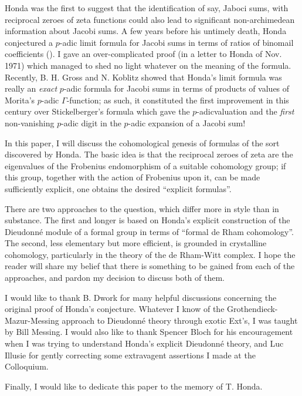 Honda was the first to suggest that the identification of say, Jaboci sums, with reciprocal zeroes of zeta functions could also lead to significant non-archimedean information about Jacobi sums. A few years before his untimely death, Honda conjectured a $p$-adic limit formula for Jacobi sums in terms of ratios of binomail coefficients (\cite{art6-key23}). I gave an over-complicated proof (in a letter to Honda of Nov. 1971) which managed to shed no light whatever on the meaning of the formula. Recently, B. H. Gross and N. Koblitz \cite{art6-key14} showed that Honda's limit formula was really an {\em exact} $p$-adic formula for Jacobi sums in terms of products of values of Morita's $p$-adic $\Gamma$-function; as such, it constituted the first improvement in this century over Stickelberger's formula which gave the $p$-adic\pageoriginale valuation and the {\em first} non-vanishing $p$-adic digit in the $p$-adic expansion of a Jacobi sum!

In this paper, I will discuss the cohomological genesis of formulas of the sort discovered by Honda. The basic idea is that the reciprocal zeroes of zeta are the eigenvalues of the Frobenius endomorphism of a suitable cohomology group; if this group, together with the action of Frobenius upon it, can be made sufficiently explicit, one obtains the desired ``explicit formulas''.

There are two approaches to the question, which differ more in style than in substance. The first and longer is based on Honda's explicit construction of the Dieudonn\'e module of a formal group in terms of ``formal de Rham cohomology''. The second, less elementary but more efficient, is grounded in crystalline cohomology, particularly in the theory of the de Rham-Witt complex. I hope the reader will share my belief that there is something to be gained from each of the approaches, and pardon my decision to discuss both of them.

I would like to thank B. Dwork for many helpful discussions concerning the original proof of Honda's conjecture. Whatever I know of the Grothendieck-Mazur-Messing approach to Dieudonn\'e theory through exotic Ext's, I was taught by Bill Messing. I would also like to thank Spencer Bloch for his encouragement when I was trying to understand Honda's explicit Dieudonn\'e theory, and Luc Illusie for gently correcting some extravagent assertions I made at the Colloquium.

Finally, I would like to dedicate this paper to the memory of T. Honda.

